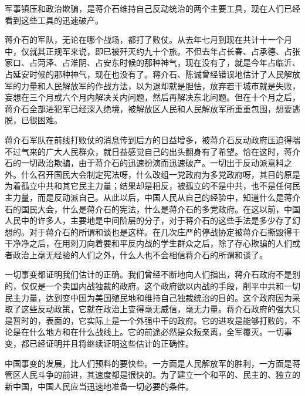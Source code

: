 军事镇压和政治欺骗，是蒋介石维持自己反动统治的两个主要工具，现在人们已经看到这些工具的迅速破产。

蒋介石的军队，无论在哪个战场，都打了败仗。从去年七月到现在共计十一个月中，仅就其正规军来说，即已被歼灭约九十个旅。不但去年占长春、占承德、占张家口、占菏泽、占淮阴、占安东时候的那种神气，现在没有了，就是今年占临沂、占延安时候的那种神气，现在也没有了。蒋介石、陈诚曾经错误地估计了人民解放军的力量和人民解放军的作战方法，以为退却就是胆怯，放弃若干城市就是失败，妄想在三个月或六个月内解决关内问题，然后再解决东北问题。但在十个月之后，蒋介石全部进犯军已经深入绝境，被解放区人民和人民解放军所重重包围，想要逃脱，已很困难。

蒋介石军队在前线打败仗的消息传到后方的日益增多，被蒋介石反动政府压迫得喘不过气来的广大人民群众，就日益感觉自己的出头翻身有了希望。恰在这时，蒋介石的一切政治欺骗，由于蒋介石的迅速扮演而迅速破产。一切出于反动派意料之外。什么召开国民大会制定宪法呀，什么改组一党政府为多党政府呀，其目的原是为着孤立中共和其它民主力量；结果却是相反，被孤立的不是中共，也不是任何民主力量，而是反动派自己。从此以后，中国人民从自己的经验中，知道什么是蒋介石的国民大会，什么是蒋介石的宪法，什么是蒋介石的多党政府。在这以前，中国人民中的许多人，主要地是中间阶层的分子，对于蒋介石的这些手法是多少存了幻想的。对于蒋介石的所谓和谈也是这样。在几次庄严的停战协定被蒋介石撕毁得干干净净之后，在用刺刀向着要和平反内战的学生群众之后，除了存心欺骗的人们或者政治上毫无经验的人们之外，什么人也不会相信蒋介石的所谓和谈了。

一切事变都证明我们估计的正确。我们曾经不断地向人们指出，蒋介石政府不是别的，仅仅是一个卖国内战独裁的政府。这个政府欲以内战的手段，削平中共和一切民主力量，达到变中国为美国殖民地和维持自己独裁统治的目的。这个政府因为采取了这些反动政策，它就在政治上变得毫无威信，毫无力量。蒋介石政府的强大只是暂时的，表面的，它实际上是一个外强中干的政府。它的进攻是能够打败的，不论是在什么地方和在什么战线上。它的前途必然是众叛亲离，全军覆灭。一切事变，都已经证明并且将继续证明这些估计的正确性。

中国事变的发展，比人们预料的要快些。一方面是人民解放军的胜利，一方面是蒋管区人民斗争的前进，其速度都是很快的。为了建立一个和平的、民主的、独立的新中国，中国人民应当迅速地准备一切必要的条件。


